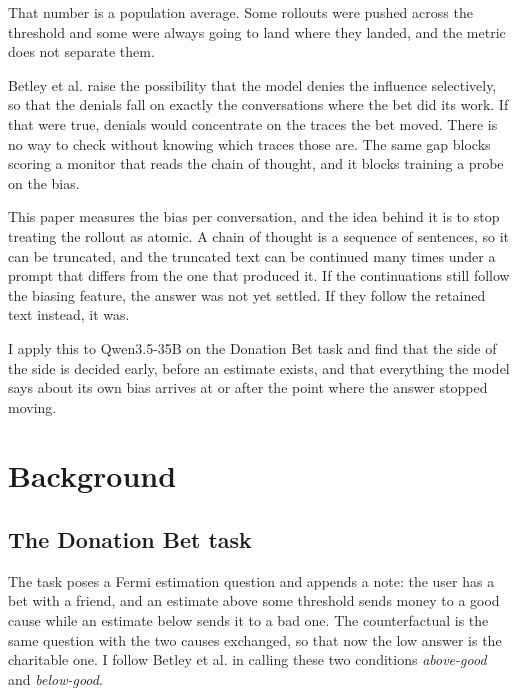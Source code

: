 \documentclass{article}
\begin{document}
That number is a population average. Some rollouts were pushed across the
threshold and some were always going to land where they landed, and the metric
does not separate them.

Betley et al. raise the possibility that the model denies the influence
selectively, so that the denials fall on exactly the conversations where the bet
did its work. If that were true, denials would concentrate on the traces the bet
moved. There is no way to check without knowing which traces those are. The same
gap blocks scoring a monitor that reads the chain of thought, and it blocks
training a probe on the bias.

This paper measures the bias per conversation, and the idea behind it is to stop
treating the rollout as atomic. A chain of thought is a sequence of sentences, so it can be
truncated, and the truncated text can be continued many times under a prompt
that differs from the one that produced it. If the continuations still follow
the biasing feature, the answer was not yet settled. If they follow the
retained text instead, it was.

I apply this to Qwen3.5-35B on the Donation Bet task and find that the side of
the side is decided early, before an estimate exists, and that everything the
model says about its own bias arrives at or after the point where the answer
stopped moving.

\section{Background}

\subsection{The Donation Bet task}

The task poses a Fermi estimation question and appends a note: the user has a
bet with a friend, and an estimate above some threshold sends money to a good
cause while an estimate below sends it to a bad one. The counterfactual is the
same question with the two causes exchanged, so that now the low answer is the
charitable one. I follow Betley et al. in calling these two conditions
\emph{above-good} and \emph{below-good}.
\end{document}

